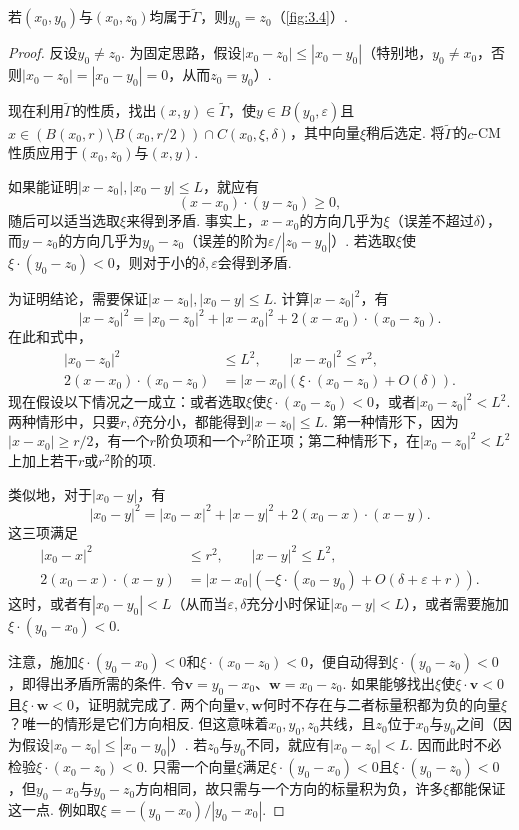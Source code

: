 \begin{lemma}\label{obj:3.23}
若$(x_0,y_0)$与$(x_0,z_0)$均属于$\widetilde\Gamma$，则$y_0=z_0$（\autoref{fig:3.4}）.
\end{lemma}
\begin{proof}
反设$y_0\ne z_0$. 为固定思路，假设$|x_0-z_0|\le|x_0-y_0|$（特别地，$y_0\ne x_0$，否则$|x_0-z_0|=|x_0-y_0|=0$，从而$z_0=y_0$）.

现在利用$\widetilde\Gamma$的性质，找出$(x,y)\in\widetilde\Gamma$，使$y\in B(y_0,\varepsilon)$且$x\in(B(x_0,r)\setminus B(x_0,r/2))\cap C(x_0,\xi,\delta)$，其中向量$\xi$稍后选定. 将$\widetilde\Gamma$的$c$-CM性质应用于$(x_0,z_0)$与$(x,y)$.

如果能证明$|x-z_0|,|x_0-y|\le L$，就应有
\[
(x-x_0)\cdot(y-z_0)\ge0,
\]
随后可以适当选取$\xi$来得到矛盾. 事实上，$x-x_0$的方向几乎为$\xi$（误差不超过$\delta$），而$y-z_0$的方向几乎为$y_0-z_0$（误差的阶为$\varepsilon/|z_0-y_0|$）. 若选取$\xi$使$\xi\cdot(y_0-z_0)<0$，则对于小的$\delta,\varepsilon$会得到矛盾.

为证明结论，需要保证$|x-z_0|,|x_0-y|\le L$. 计算$|x-z_0|^2$，有
\[
|x-z_0|^2=|x_0-z_0|^2+|x-x_0|^2+2(x-x_0)\cdot(x_0-z_0).
\]
在此和式中，
\begin{equation*}
\begin{aligned}
|x_0-z_0|^2&\le L^2,\qquad |x-x_0|^2\le r^2,\\
2(x-x_0)\cdot(x_0-z_0)&=|x-x_0|(\xi\cdot(x_0-z_0)+O(\delta)).
\end{aligned}
\end{equation*}
现在假设以下情况之一成立：或者选取$\xi$使$\xi\cdot(x_0-z_0)<0$，或者$|x_0-z_0|^2<L^2$. 两种情形中，只要$r,\delta$充分小，都能得到$|x-z_0|\le L$. 第一种情形下，因为$|x-x_0|\ge r/2$，有一个$r$阶负项和一个$r^2$阶正项；第二种情形下，在$|x_0-z_0|^2<L^2$上加上若干$r$或$r^2$阶的项.

类似地，对于$|x_0-y|$，有
\[
|x_0-y|^2=|x_0-x|^2+|x-y|^2+2(x_0-x)\cdot(x-y).
\]
这三项满足
\begin{equation*}
\begin{aligned}
|x_0-x|^2&\le r^2,\qquad |x-y|^2\le L^2,\\
2(x_0-x)\cdot(x-y)&=|x-x_0|(-\xi\cdot(x_0-y_0)+O(\delta+\varepsilon+r)).
\end{aligned}
\end{equation*}
这时，或者有$|x_0-y_0|<L$（从而当$\varepsilon,\delta$充分小时保证$|x_0-y|<L$），或者需要施加$\xi\cdot(y_0-x_0)<0$.

注意，施加$\xi\cdot(y_0-x_0)<0$和$\xi\cdot(x_0-z_0)<0$，便自动得到$\xi\cdot(y_0-z_0)<0$，即得出矛盾所需的条件. 令$\mathbf v=y_0-x_0$、$\mathbf w=x_0-z_0$. 如果能够找出$\xi$使$\xi\cdot \mathbf v<0$且$\xi\cdot \mathbf w<0$，证明就完成了. 两个向量$\mathbf v,\mathbf w$何时不存在与二者标量积都为负的向量$\xi$？唯一的情形是它们方向相反. 但这意味着$x_0,y_0,z_0$共线，且$z_0$位于$x_0$与$y_0$之间（因为假设$|x_0-z_0|\le|x_0-y_0|$）. 若$z_0$与$y_0$不同，就应有$|x_0-z_0|<L$. 因而此时不必检验$\xi\cdot(x_0-z_0)<0$. 只需一个向量$\xi$满足$\xi\cdot(y_0-x_0)<0$且$\xi\cdot(y_0-z_0)<0$，但$y_0-x_0$与$y_0-z_0$方向相同，故只需与一个方向的标量积为负，许多$\xi$都能保证这一点. 例如取$\xi=-(y_0-x_0)/|y_0-x_0|$.
\end{proof}

